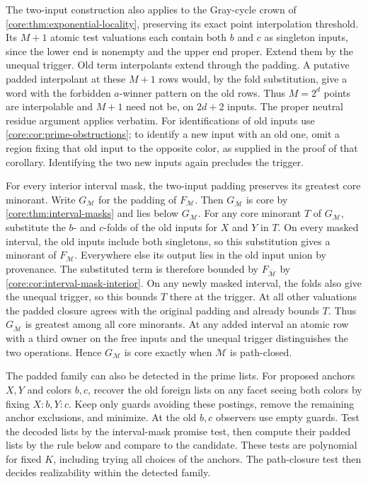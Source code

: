 The two-input construction also applies to the
Gray-cycle crown of
\cref{core:thm:exponential-locality}, preserving
its exact point interpolation threshold. Its
$M+1$ atomic test valuations each contain both
$b$ and $c$ as singleton inputs, since the lower
end is nonempty and the upper end proper. Extend
them by the unequal trigger. Old term interpolants
extend through the padding. A putative padded
interpolant at these $M+1$ rows
would, by the fold substitution, give a word with
the forbidden $a$-winner pattern on the old rows.
Thus $M=2^d$ points are interpolable and $M+1$
need not be, on $2d+2$ inputs. The proper neutral
residue argument applies verbatim. For
identifications of old inputs use
\cref{core:cor:prime-obstructions}; to identify a
new input with an old one, omit a region fixing
that old input to the opposite color, as supplied
in the proof of that corollary. Identifying the
two new inputs again precludes the trigger.

For every interior interval mask, the two-input
padding preserves its greatest core minorant.
Write $G_{\mathcal M}$ for the padding of
$F_{\mathcal M}$. Then $G_{\overline{\mathcal M}}$
is core by \cref{core:thm:interval-masks} and
lies below $G_{\mathcal M}$. For any core minorant
$T$ of $G_{\mathcal M}$, substitute the $b$- and
$c$-folds of the old inputs for $X$ and $Y$ in $T$.
On every masked interval, the old inputs include
both singletons, so this substitution gives a
minorant of $F_{\mathcal M}$. Everywhere else its
output lies in the old input union by provenance.
The substituted term is therefore bounded by
$F_{\overline{\mathcal M}}$ by
\cref{core:cor:interval-mask-interior}. On any newly
masked interval, the folds also give the unequal
trigger, so this bounds $T$ there at the trigger.
At all other valuations the padded closure agrees
with the original padding and already bounds $T$.
Thus $G_{\overline{\mathcal M}}$ is greatest among
all core minorants. At any added interval an atomic
row with a third owner on the free inputs and the
unequal trigger distinguishes the two operations.
Hence $G_{\mathcal M}$ is core exactly when
$\mathcal M$ is path-closed.

The padded family can also be detected in the
prime lists. For proposed anchors $X,Y$ and
colors $b,c$, recover the old foreign lists on
any facet seeing both colors by fixing
$X:b,Y:c$. Keep only guards avoiding these
postings, remove the remaining anchor exclusions,
and minimize. At the old $b,c$ observers use
empty guards. Test the decoded lists by the
interval-mask promise test, then compute their
padded lists by the rule below and compare to
the candidate. These tests are polynomial for
fixed $K$, including trying all choices of the
anchors. The path-closure test then decides
realizability within the detected family.

